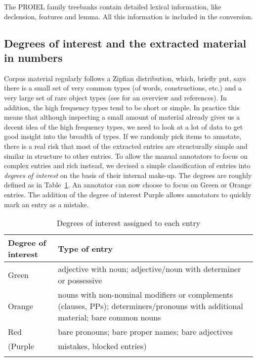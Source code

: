 \documentclass[output=paper,colorlinks,citecolor=brown]{langscibook}
\begin{document}
The PROIEL family treebanks contain detailed lexical information, like
declension,  features and lemma. All this information is
included in the conversion.

\subsection{Degrees of interest and the extracted material in numbers}
\label{sec:DegInt}

Corpus material regularly follows a Zipfian distribution, which, briefly put, says there is a small set of very common types (of words, constructions, etc.) and a very large set of rare object types (see \citealp{baroni:2009} for an overview and references). In addition, the high frequency types tend to be short or simple. In practice this means that although inspecting a small amount of  material already gives us a decent idea of the high frequency types, we need to look at a lot of data to get good insight into the breadth of types. If we randomly pick items to annotate, there is a real risk that most of the extracted entries are structurally simple
and similar in structure to other entries. To allow the manual
annotators to focus on complex entries and rich  instead, we
devised a simple classification of entries into \textit{degrees of
  interest} on the basis of their internal make-up. The degrees are
roughly defined as in Table~\ref{tb:degrees_of_interest}. An annotator can now choose to focus on Green or Orange entries. The addition of the degree of interest Purple allows annotators to quickly mark an entry as a mistake.

\begin{table}
    \begin{tabularx}{\textwidth}{lX}\lsptoprule
    Degree of interest & Type of entry\\\midrule
    Green  & adjective with noun; adjective\slash noun with determiner or possessive\\ 
    Orange & nouns with non-nominal modifiers or complements (clauses, PPs); determiners/pronouns with additional material; bare common nouns\\
    Red    & bare pronouns; bare proper names; bare adjectives\\\addlinespace
    (Purple & mistakes, blocked entries)\\\lspbottomrule
    \end{tabularx}
    \caption{Degrees of interest assigned to each entry\label{tb:degrees_of_interest}}
\end{table}
\end{document}
